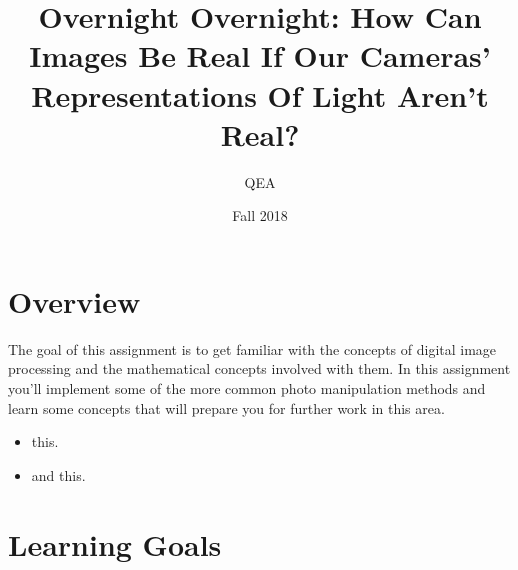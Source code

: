 \documentclass{tufte-handout}
\title{Overnight Overnight: How Can Images Be Real If Our Cameras' Representations Of Light Aren't Real?}
\author{QEA}
\date{Fall 2018}
\begin{document}
\maketitle
\thispagestyle{firstpage}


\section{Overview}
The goal of this assignment is to get familiar with the concepts of digital image processing and the mathematical concepts involved with them. In this assignment you'll implement some of the more common photo manipulation methods and learn some concepts that will prepare you for further work in this area.
\begin{itemize}
\item this.
\item and this.
\end{itemize}

\section{Learning Goals}
\end{document}

